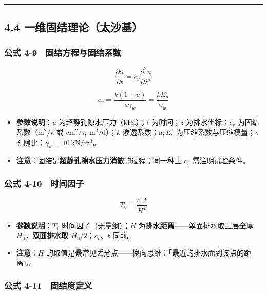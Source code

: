 \documentclass[
]{article}
\providecommand{\tightlist}{%
  \setlength{\itemsep}{0pt}\setlength{\parskip}{0pt}}
\begin{document}
\begin{center}\rule{0.5\linewidth}{0.5pt}\end{center}

\subsection{4.4
一维固结理论（太沙基）}\label{ux4e00ux7ef4ux56faux7ed3ux7406ux8bbaux592aux6c99ux57fa}

\subsubsection{公式
4-9　固结方程与固结系数}\label{ux516cux5f0f-4-9-ux56faux7ed3ux65b9ux7a0bux4e0eux56faux7ed3ux7cfbux6570}

\[\frac{\partial u}{\partial t}=c_v\frac{\partial^2 u}{\partial z^2}\]

\[c_v=\frac{k(1+e)}{a\gamma_w}=\frac{kE_s}{\gamma_w}\]

\begin{itemize}
\tightlist
\item
  \textbf{参数说明}：\(u\) 为超静孔隙水压力（\(\mathrm{kPa}\)）；\(t\)
  为时间；\(z\) 为排水坐标；\(c_v\) 为固结系数（\(\mathrm{m^2/a}\) 或
  \(\mathrm{cm^2/s},\ \mathrm{m^2/d}\)）；\(k\) 渗透系数；\(a,E_s\)
  为压缩系数与压缩模量；\(e\) 孔隙比；\(\gamma_w=10\ \mathrm{kN/m^3}\)。
\item
  \textbf{注意}：固结是\textbf{超静孔隙水压力消散}的过程；同一种土
  \(c_v\) 需注明试验条件。
\end{itemize}

\subsubsection{公式
4-10　时间因子}\label{ux516cux5f0f-4-10-ux65f6ux95f4ux56e0ux5b50}

\[\boxed{T_v=\frac{c_v\,t}{H^2}}\]

\begin{itemize}
\tightlist
\item
  \textbf{参数说明}：\(T_v\) 时间因子（无量纲）；\(H\)
  为\textbf{排水距离}------单面排水取土层全厚
  \(H_0\)，\textbf{双面排水取 \(H_0/2\)}；\(c_v\)、\(t\) 同前。
\item
  \textbf{注意}：\(H\)
  的取值是最常见丢分点------换向思维：「最近的排水面到该点的距离」。
\end{itemize}

\subsubsection{公式
4-11　固结度定义}\label{ux516cux5f0f-4-11-ux56faux7ed3ux5ea6ux5b9aux4e49}
\end{document}
